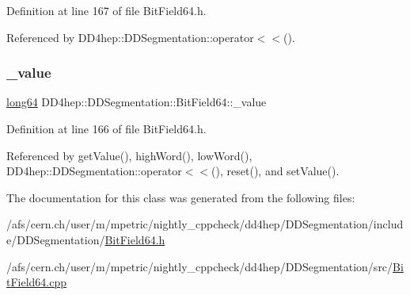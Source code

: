 Definition at line 167 of file Bit\+Field64.\+h.



Referenced by D\+D4hep\+::\+D\+D\+Segmentation\+::operator$<$$<$().

\hypertarget{class_d_d4hep_1_1_d_d_segmentation_1_1_bit_field64_a5c784ab1cd7dcd334b3a06cd1ce496f4}{}\label{class_d_d4hep_1_1_d_d_segmentation_1_1_bit_field64_a5c784ab1cd7dcd334b3a06cd1ce496f4} 
\subsubsection{\texorpdfstring{\+\_\+value}{\_value}}
{\footnotesize\ttfamily \hyperlink{namespace_d_d4hep_ac2a70e722b33dc7ddaa20db8954ac836}{long64} D\+D4hep\+::\+D\+D\+Segmentation\+::\+Bit\+Field64\+::\+\_\+value\hspace{0.3cm}{\ttfamily [protected]}}



Definition at line 166 of file Bit\+Field64.\+h.



Referenced by get\+Value(), high\+Word(), low\+Word(), D\+D4hep\+::\+D\+D\+Segmentation\+::operator$<$$<$(), reset(), and set\+Value().



The documentation for this class was generated from the following files\+:\begin{DoxyCompactItemize}
\item 
/afs/cern.\+ch/user/m/mpetric/nightly\+\_\+cppcheck/dd4hep/\+D\+D\+Segmentation/include/\+D\+D\+Segmentation/\hyperlink{_d_d_segmentation_2include_2_d_d_segmentation_2_bit_field64_8h}{Bit\+Field64.\+h}\item 
/afs/cern.\+ch/user/m/mpetric/nightly\+\_\+cppcheck/dd4hep/\+D\+D\+Segmentation/src/\hyperlink{_bit_field64_8cpp}{Bit\+Field64.\+cpp}\end{DoxyCompactItemize}
